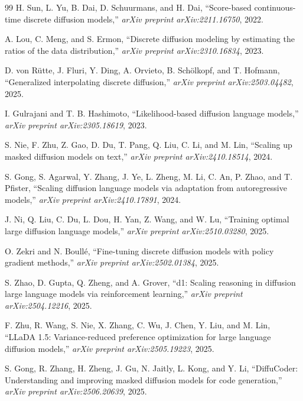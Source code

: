 \documentclass[11pt]{article}
\begin{document}
\begin{thebibliography}{99}
H. Sun, L. Yu, B. Dai, D. Schuurmans, and H. Dai, ``Score-based continuous-time discrete diffusion models,'' \textit{arXiv preprint arXiv:2211.16750}, 2022.

A. Lou, C. Meng, and S. Ermon, ``Discrete diffusion modeling by estimating the ratios of the data distribution,'' \textit{arXiv preprint arXiv:2310.16834}, 2023.

D. von R\"utte, J. Fluri, Y. Ding, A. Orvieto, B. Sch\"olkopf, and T. Hofmann, ``Generalized interpolating discrete diffusion,'' \textit{arXiv preprint arXiv:2503.04482}, 2025.

I. Gulrajani and T. B. Hashimoto, ``Likelihood-based diffusion language models,'' \textit{arXiv preprint arXiv:2305.18619}, 2023.

S. Nie, F. Zhu, Z. Gao, D. Du, T. Pang, Q. Liu, C. Li, and M. Lin, ``Scaling up masked diffusion models on text,'' \textit{arXiv preprint arXiv:2410.18514}, 2024.

S. Gong, S. Agarwal, Y. Zhang, J. Ye, L. Zheng, M. Li, C. An, P. Zhao, and T. Pfister, ``Scaling diffusion language models via adaptation from autoregressive models,'' \textit{arXiv preprint arXiv:2410.17891}, 2024.

J. Ni, Q. Liu, C. Du, L. Dou, H. Yan, Z. Wang, and W. Lu, ``Training optimal large diffusion language models,'' \textit{arXiv preprint arXiv:2510.03280}, 2025.

O. Zekri and N. Boull\'e, ``Fine-tuning discrete diffusion models with policy gradient methods,'' \textit{arXiv preprint arXiv:2502.01384}, 2025.

S. Zhao, D. Gupta, Q. Zheng, and A. Grover, ``d1: Scaling reasoning in diffusion large language models via reinforcement learning,'' \textit{arXiv preprint arXiv:2504.12216}, 2025.

F. Zhu, R. Wang, S. Nie, X. Zhang, C. Wu, J. Chen, Y. Liu, and M. Lin, ``LLaDA 1.5: Variance-reduced preference optimization for large language diffusion models,'' \textit{arXiv preprint arXiv:2505.19223}, 2025.

S. Gong, R. Zhang, H. Zheng, J. Gu, N. Jaitly, L. Kong, and Y. Li, ``DiffuCoder: Understanding and improving masked diffusion models for code generation,'' \textit{arXiv preprint arXiv:2506.20639}, 2025.

\end{thebibliography}
\end{document}
